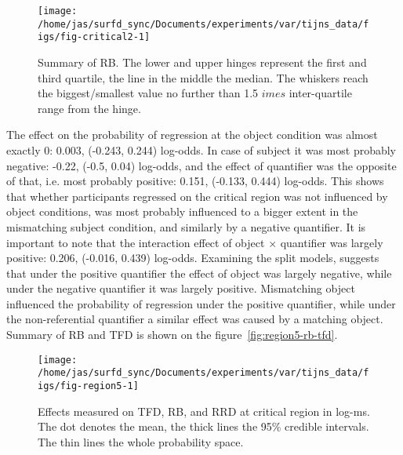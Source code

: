\begin{knitrout}
\color{fgcolor}\begin{figure}
\texttt{[image: /home/jas/surfd\_sync/Documents/experiments/var/tijns\_data/figs/fig-critical2-1]} \caption{\label{fig:visual-summary-crit-rb}Summary of RB. The lower and upper hinges represent the first and third quartile, the line in the middle the median. The whiskers reach the biggest/smallest value no further than 1.5 $	imes$ inter-quartile range from the hinge.}\label{fig:fig-critical2}
\end{figure}

\end{knitrout}

The effect on the probability of regression at the object condition was
almost exactly 0: 0.003, (-0.243, 0.244) log-odds. In case of subject it was most probably negative: -0.22, (-0.5, 0.04) log-odds, and the effect of quantifier was the opposite of that, i.e. most probably positive: 0.151, (-0.133, 0.444) log-odds. This shows that whether participants regressed on the critical region was not influenced by object conditions, was most probably influenced to a bigger extent in the mismatching subject condition, and similarly by a negative quantifier.
It is important to note that the interaction effect of object $\times$ quantifier was largely positive: 0.206, (-0.016, 0.439) log-odds. Examining the split models, suggests that under the positive quantifier the effect of object was largely negative, while under the negative quantifier it was largely positive. Mismatching object influenced the probability of regression under the positive quantifier, while under the non-referential quantifier a similar effect was caused by a matching object.
Summary of RB and TFD is shown on the figure~\ref{fig:region5-rb-tfd}.

\begin{knitrout}
\color{fgcolor}\begin{figure}
\texttt{[image: /home/jas/surfd\_sync/Documents/experiments/var/tijns\_data/figs/fig-region5-1]} \caption{\label{fig:region5-rb-tfd}Effects measured on TFD, RB, and RRD at critical region in log-ms. The dot denotes the mean, the thick lines the 95\% credible intervals. The thin lines the whole probability space.}\label{fig:fig-region5}
\end{figure}

\end{knitrout}

